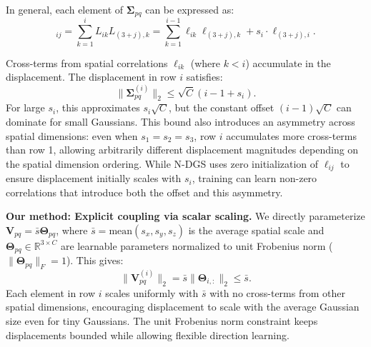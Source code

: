 \documentclass{article}
\theoremstyle{plain}
\theoremstyle{definition}
\theoremstyle{remark}
\begin{document}
In general, each element of $\boldsymbol{\Sigma}_{pq}$ can be expressed as:
\begin{equation}
[\boldsymbol{\Sigma}_{pq}]_{ij} = \sum_{k=1}^{i} L_{ik} L_{(3+j),k} = \sum_{k=1}^{i-1} \ell_{ik} \ell_{(3+j),k} + s_i \cdot \ell_{(3+j),i}.
\end{equation}

Cross-terms from spatial correlations $\ell_{ik}$ (where $k < i$) accumulate in the displacement. The displacement in row $i$ satisfies:
\begin{equation}
\|\boldsymbol{\Sigma}_{pq}^{(i)}\|_2 \leq \sqrt{C}(i-1 + s_i).
\end{equation}
For large $s_i$, this approximates $s_i \sqrt{C}$, but the constant offset $(i-1)\sqrt{C}$ can dominate for small Gaussians. This bound also introduces an asymmetry across spatial dimensions: even when $s_1 = s_2 = s_3$, row $i$ accumulates more cross-terms than row 1, allowing arbitrarily different displacement magnitudes depending on the spatial dimension ordering. While N-DGS uses zero initialization of $\ell_{ij}$ to ensure displacement initially scales with $s_i$, training can learn non-zero correlations that introduce both the offset and this asymmetry.

\textbf{Our method: Explicit coupling via scalar scaling.} We directly parameterize $\mathbf{V}_{pq} = \bar{s} \boldsymbol{\Theta}_{pq}$, where $\bar{s} = \text{mean}(s_x, s_y, s_z)$ is the average spatial scale and $\boldsymbol{\Theta}_{pq} \in \mathbb{R}^{3 \times C}$ are learnable parameters normalized to unit Frobenius norm ($\|\boldsymbol{\Theta}_{pq}\|_F = 1$). This gives:
\begin{equation}
\|\mathbf{V}_{pq}^{(i)}\|_2 = \bar{s} \|\boldsymbol{\Theta}_{i,:}\|_2 \leq \bar{s}.
\end{equation}
Each element in row $i$ scales uniformly with $\bar{s}$ with no cross-terms from other spatial dimensions, encouraging displacement to scale with the average Gaussian size even for tiny Gaussians. The unit Frobenius norm constraint keeps displacements bounded while allowing flexible direction learning.
\end{document}
